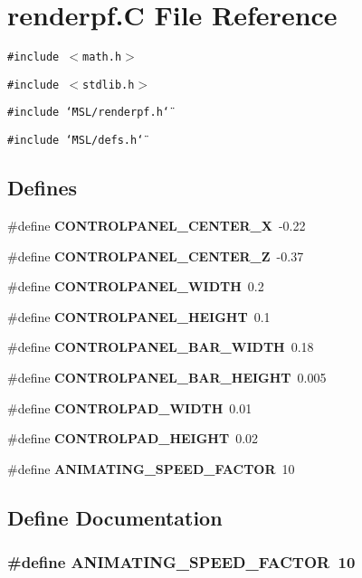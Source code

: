 \section{renderpf.C File Reference}
\label{renderpf_8C}
{\tt \#include $<$math.h$>$}\par
{\tt \#include $<$stdlib.h$>$}\par
{\tt \#include \char`\"{}MSL/renderpf.h\char`\"{}}\par
{\tt \#include \char`\"{}MSL/defs.h\char`\"{}}\par
\subsection*{Defines}
\begin{CompactItemize}
\item 
\#define {\bf CONTROLPANEL\_\-CENTER\_\-X}\ -0.22
\item 
\#define {\bf CONTROLPANEL\_\-CENTER\_\-Z}\ -0.37
\item 
\#define {\bf CONTROLPANEL\_\-WIDTH}\ 0.2
\item 
\#define {\bf CONTROLPANEL\_\-HEIGHT}\ 0.1
\item 
\#define {\bf CONTROLPANEL\_\-BAR\_\-WIDTH}\ 0.18
\item 
\#define {\bf CONTROLPANEL\_\-BAR\_\-HEIGHT}\ 0.005
\item 
\#define {\bf CONTROLPAD\_\-WIDTH}\ 0.01
\item 
\#define {\bf CONTROLPAD\_\-HEIGHT}\ 0.02
\item 
\#define {\bf ANIMATING\_\-SPEED\_\-FACTOR}\ 10
\end{CompactItemize}


\subsection{Define Documentation}
\subsubsection{\setlength{\rightskip}{0pt plus 5cm}\#define ANIMATING\_\-SPEED\_\-FACTOR\ 10}\label{renderpf_8C_a8}



